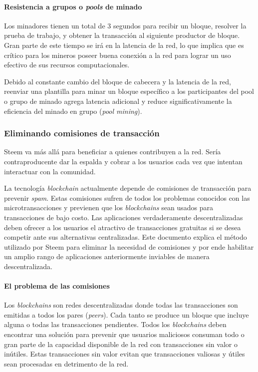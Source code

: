 \documentclass[a4paper,titlepage,final]{article}
\begin{document}
\paragraph{Resistencia a grupos o \textit{pools} de minado}

Los minadores tienen un total de 3 segundos para recibir un bloque, resolver la prueba de trabajo, y obtener la transacción al siguiente productor de bloque. Gran parte de este tiempo se irá en la latencia de la red, lo que implica que es crítico para los mineros poseer buena conexión a la red para lograr un uso efectivo de sus recursos computacionales.

Debido al constante cambio del bloque de cabecera y la latencia de la red, reenviar una plantilla para minar un bloque específico a los participantes del pool o grupo de minado agrega latencia adicional y reduce significativamente la eficiencia del minado en grupo (\textit{pool mining}).

\subsubsection{Eliminando comisiones de transacción}

Steem va más allá para beneficiar a quienes contribuyen a la red. Sería contraproducente dar la espalda y cobrar a los usuarios cada vez que intentan interactuar con la comunidad.

La tecnología \textit{blockchain} actualmente depende de comisiones de transacción para prevenir \textit{spam}. Estas comisiones sufren de todos los problemas conocidos con las microtransacciones y previenen que los \textit{blockchains} sean usados para transacciones de bajo costo. Las aplicaciones verdaderamente descentralizadas deben ofrecer a los usuarios el atractivo de transacciones gratuitas si se desea competir ante sus alternativas centralizadas. Este documento explica el método utilizado por Steem para eliminar la necesidad de comisiones y por ende habilitar un amplio rango de aplicaciones anteriormente inviables de manera descentralizada.

\paragraph{El problema de las comisiones}

Los \textit{blockchains} son redes descentralizadas donde todas las transacciones son emitidas a todos los pares (\textit{peers}). Cada tanto se produce un bloque que incluye alguna o todas las transacciones pendientes. Todos los \textit{blockchains} deben encontrar una solución para prevenir que usuarios maliciosos consuman todo o gran parte de la capacidad disponible de la red con transacciones sin valor o inútiles. Estas transacciones sin valor evitan que transacciones valiosas y útiles sean procesadas en detrimento de la red.
\end{document}
